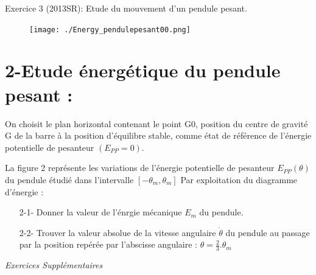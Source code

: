 \documentclass[12pt, french]{article}
\begin{document}
\begin{Box2}{Exercice 3 (2013SR): Etude du mouvement d’un pendule pesant. }
  \begin{figure}
  \begin{center}
	  \vspace{-1cm}
	\texttt{[image: ./Energy\_pendulepesant00.png]}
  \end{center}
  \end{figure}

  \section*{2-Etude énergétique du pendule pesant : }

  On choisit le plan horizontal contenant le point G0, position du centre de gravité G de
la barre à la position d’équilibre stable, comme état de référence de l’énergie
  potentielle de pesanteur $(E_{PP} = 0)$.


La figure 2 représente les variations de
  l’énergie potentielle de pesanteur $E_{PP}(\theta)$
du pendule étudié dans l’intervalle $[-\theta_m, \theta_m]$
Par exploitation du diagramme d’énergie :
   \begin{enumerate}
     \item[2-1-] Donner la valeur de l’énrgie
mécanique $E_m$ du pendule.
\item[2-2-] Trouver la valeur absolue de la
vitesse angulaire $\dot{\theta}$ du pendule
au passage par la position
       repérée par l’abscisse angulaire : $\theta = \frac{2}{3}.\theta_m$
   \end{enumerate}
\end{Box2}



\begin{center}
   \Large{ \em{Exercices Supplémentaires}}
\end{center}
\end{document}
